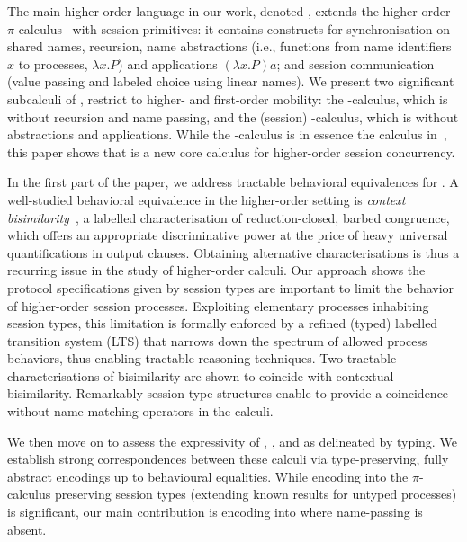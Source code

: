 The main higher-order language in our work, denoted \HOp,
extends the higher-order $\pi$-calculus~\cite{SangiorgiD:expmpa} with session primitives:
it contains constructs for 
synchronisation on shared names, 
recursion, 
name abstractions (i.e., functions from name identifiers $x$ to processes, $\lambda x.P$) and applications $(\lambda x.P)a$;
and session communication (value passing and
labeled choice using linear names). 
We present two significant subcalculi of \HOp, restrict to higher- and first-order mobility:
the \HO-calculus, which is \HOp without recursion and name passing, and 
the (session) \sessp-calculus, which is \HOp without abstractions and applications.  
While the \sessp-calculus is 
in essence the calculus in~\cite{honda.vasconcelos.kubo:language-primitives}, 
this paper shows that \HO  is a new core calculus 
for higher-order session concurrency.

In the first part of the paper, we address tractable behavioral equivalences
for \HOp.
A well-studied behavioral equivalence in the higher-order setting 
is \emph{context bisimilarity}~\cite{San96H},
a labelled characterisation of reduction-closed, barbed congruence, 
which offers an appropriate discriminative power at the price of heavy universal quantifications in output clauses.
Obtaining alternative characterisations 
is thus a recurring issue 
in the study of higher-order calculi. 
Our approach 
shows the protocol specifications given by session types are 
important to  limit 
the behavior of higher-order session processes. 
Exploiting elementary processes inhabiting session types, 
this limitation is formally enforced by 
a refined (typed) labelled transition system (LTS)
that narrows down the spectrum of allowed process behaviors, 
thus enabling tractable reasoning techniques. 
Two tractable characterisations of bisimilarity 
are shown to coincide with contextual bisimilarity.
Remarkably session type structures enable to provide 
a coincidence without name-matching operators in the calculi.

We then move on to 
assess the expressivity 
 of \HOp, \HO, and \sessp as delineated by typing. 
We establish strong correspondences between 
these calculi  via type-preserving, fully abstract encodings up to 
behavioural equalities. While encoding \HOp 
into the $\pi$-calculus preserving session types 
(extending  known  results for untyped processes) is significant, 
our main contribution is 
encoding \HOp into \HO where name-passing is absent.  

